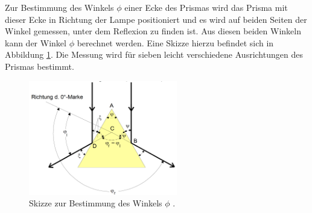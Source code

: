 Zur Bestimmung des Winkels $\phi$ einer Ecke des Prismas wird das Prisma mit dieser
Ecke in Richtung der Lampe positioniert und es wird auf beiden Seiten der Winkel gemessen,
unter dem Reflexion zu finden ist. Aus diesen beiden Winkeln kann der Winkel $\phi$
berechnet werden. Eine Skizze hierzu befindet sich in Abbildung \ref{fig:phi}.
Die Messung wird für sieben leicht verschiedene Ausrichtungen des Prismas bestimmt.

\begin{figure}[H]
  \centering
  \includegraphics[height=5cm]{data/phi.png}
  \caption{Skizze zur Bestimmung des Winkels $\phi$ \cite{Versuchsanleitung}.}
  \label{fig:phi}
\end{figure}
